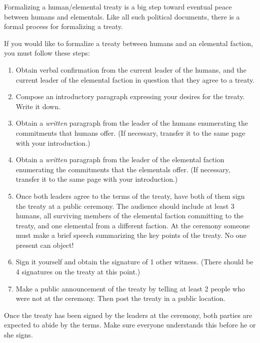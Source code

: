 \documentclass[green]{elementals}
\begin{document}
\name{\gTreaty{}}

Formalizing a human/elemental treaty is a big step toward eventual peace between humans and elementals. Like all such political documents, there is a formal process for formalizing a treaty.

If you would like to formalize a treaty between humans and an elemental faction, you must follow these steps:
\begin{enumerate}
  \item Obtain verbal confirmation from the current leader of the humans, and the current leader of the elemental faction in question that they agree to a treaty.
  \item Compose an introductory paragraph expressing your desires for the treaty.  Write it down.
  \item Obtain a \emph{written} paragraph from the leader of the humans enumerating the commitments that humans offer. (If necessary, transfer it to the same page with your introduction.)
  \item Obtain a \emph{written} paragraph from the leader of the elemental faction enumerating the commitments that the elementals offer. (If necessary, transfer it to the same page with your introduction.)
  \item Once both leaders agree to the terms of the treaty, have both of them sign the treaty at a public ceremony.  The audience should include at least 3 humans, all surviving members of the elemental faction committing to the treaty, and one elemental from a different faction. At the ceremony someone must make a brief speech summarizing the key points of the treaty. No one present can object!
  \item Sign it yourself and obtain the signature of 1 other witness. (There should be 4 signatures on the treaty at this point.)
  \item Make a public announcement of the treaty by telling at least 2 people who were not at the ceremony.  Then post the treaty in a public location.
\end{enumerate}

Once the treaty has been signed by the leaders at the ceremony, both parties are expected to abide by the terms. Make sure everyone understands this before he or she signs.
\end{document}
